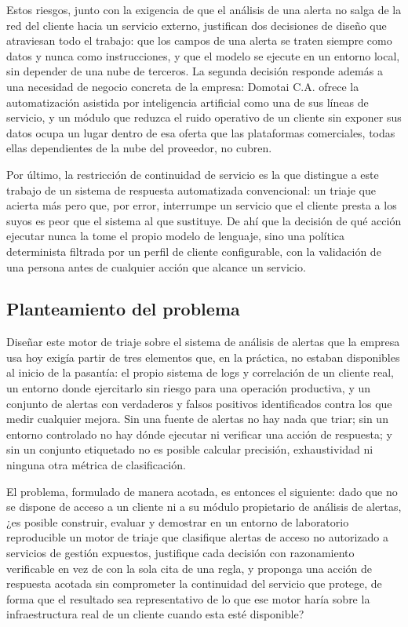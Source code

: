 Estos riesgos, junto con la exigencia de que el análisis de una alerta no salga de la red del
cliente hacia un servicio externo, justifican dos decisiones de diseño que atraviesan todo el
trabajo: que los campos de una alerta se traten siempre como datos y nunca como instrucciones, y
que el modelo se ejecute en un entorno local, sin depender de una nube de terceros. La segunda
decisión responde además a una necesidad de negocio concreta de la empresa: Domotai C.A. ofrece
la automatización asistida por inteligencia artificial como una de sus líneas de servicio, y un
módulo que reduzca el ruido operativo de un cliente sin exponer sus datos ocupa un lugar dentro de
esa oferta que las plataformas comerciales, todas ellas dependientes de la nube del proveedor, no
cubren.

Por último, la restricción de continuidad de servicio es la que distingue a este trabajo de un
sistema de respuesta automatizada convencional: un triaje que acierta más pero que, por error,
interrumpe un servicio que el cliente presta a los suyos es peor que el sistema al que sustituye.
De ahí que la decisión de qué acción ejecutar nunca la tome el propio modelo de lenguaje, sino una
política determinista filtrada por un perfil de cliente configurable, con la validación de una
persona antes de cualquier acción que alcance un servicio.

\subsection*{Planteamiento del problema}

Diseñar este motor de triaje sobre el sistema de análisis de alertas que la empresa usa hoy exigía
partir de tres elementos que, en la práctica, no estaban disponibles al inicio de la pasantía: el
propio sistema de logs y correlación de un cliente real, un entorno donde ejercitarlo sin riesgo
para una operación productiva, y un conjunto de alertas con verdaderos y falsos positivos
identificados contra los que medir cualquier mejora. Sin una fuente de alertas no hay nada que
triar; sin un entorno controlado no hay dónde ejecutar ni verificar una acción de respuesta; y sin
un conjunto etiquetado no es posible calcular precisión, exhaustividad ni ninguna otra métrica de
clasificación.

El problema, formulado de manera acotada, es entonces el siguiente: dado que no se dispone de
acceso a un cliente ni a su módulo propietario de análisis de alertas, ¿es posible construir,
evaluar y demostrar en un entorno de laboratorio reproducible un motor de triaje que clasifique
alertas de acceso no autorizado a servicios de gestión expuestos, justifique cada decisión con
razonamiento verificable en vez de con la sola cita de una regla, y proponga una acción de
respuesta acotada sin comprometer la continuidad del servicio que protege, de forma que el
resultado sea representativo de lo que ese motor haría sobre la infraestructura real de un cliente
cuando esta esté disponible?

